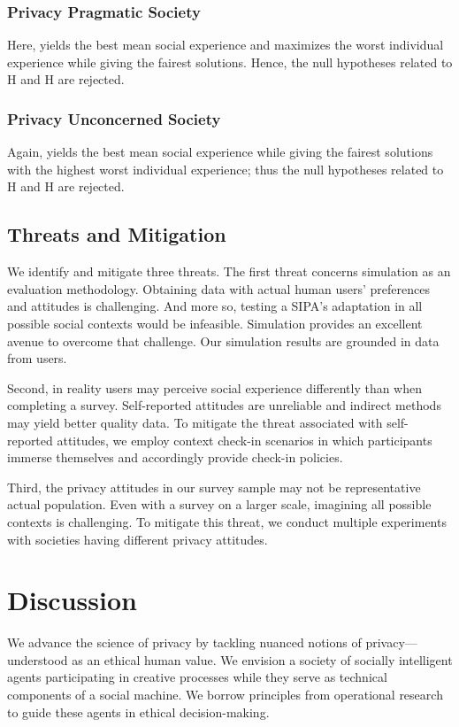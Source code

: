 \subsubsection{Privacy Pragmatic Society}

Here, \frameworkAinur yields the best mean social experience and maximizes the worst individual experience while giving the fairest solutions. Hence, the null hypotheses related to H and H are rejected.

\subsubsection{Privacy Unconcerned Society}

Again, \frameworkAinur yields the best mean social experience while giving the fairest solutions with the highest worst individual experience; thus the null hypotheses related to H and H are rejected. 

\subsection{Threats and Mitigation}

We identify and mitigate three threats. 
%
The first threat concerns simulation as an evaluation methodology. Obtaining data with actual human users' preferences and attitudes is challenging. And more so, testing a SIPA's adaptation
in all possible social contexts would be infeasible. Simulation provides an excellent avenue to overcome that challenge. Our simulation results are grounded in data from users. 

Second, in reality users may perceive social experience differently than when completing a survey. Self-reported attitudes are unreliable and indirect methods may yield better quality data. To mitigate the threat associated with self-reported attitudes, we employ context check-in scenarios in which participants immerse themselves and accordingly provide check-in policies.

Third, the privacy attitudes in our survey sample may not be representative actual population. Even with a survey on a larger scale, imagining all possible contexts is challenging. To mitigate this threat, we conduct multiple experiments with societies having different privacy attitudes. 

\section{Discussion}
\label{sec:discussion}
We advance the science of privacy by tackling nuanced notions of privacy---understood as an ethical human value. We envision a society of socially intelligent agents participating in creative processes while they serve as technical components of a social machine. We borrow principles from operational research to guide these agents in ethical decision-making.

